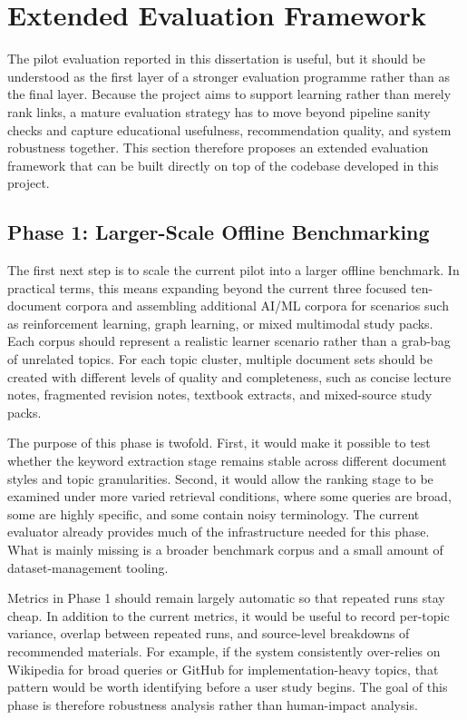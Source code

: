 \documentclass[10pt,journal,compsoc]{IEEEtran}
\begin{document}
\section{Extended Evaluation Framework}

The pilot evaluation reported in this dissertation is useful, but it should be understood as the first layer of a stronger evaluation programme rather than as the final layer. Because the project aims to support learning rather than merely rank links, a mature evaluation strategy has to move beyond pipeline sanity checks and capture educational usefulness, recommendation quality, and system robustness together. This section therefore proposes an extended evaluation framework that can be built directly on top of the codebase developed in this project.

\subsection{Phase 1: Larger-Scale Offline Benchmarking}

The first next step is to scale the current pilot into a larger offline benchmark. In practical terms, this means expanding beyond the current three focused ten-document corpora and assembling additional AI/ML corpora for scenarios such as reinforcement learning, graph learning, or mixed multimodal study packs. Each corpus should represent a realistic learner scenario rather than a grab-bag of unrelated topics. For each topic cluster, multiple document sets should be created with different levels of quality and completeness, such as concise lecture notes, fragmented revision notes, textbook extracts, and mixed-source study packs.

The purpose of this phase is twofold. First, it would make it possible to test whether the keyword extraction stage remains stable across different document styles and topic granularities. Second, it would allow the ranking stage to be examined under more varied retrieval conditions, where some queries are broad, some are highly specific, and some contain noisy terminology. The current evaluator already provides much of the infrastructure needed for this phase. What is mainly missing is a broader benchmark corpus and a small amount of dataset-management tooling.

Metrics in Phase 1 should remain largely automatic so that repeated runs stay cheap. In addition to the current metrics, it would be useful to record per-topic variance, overlap between repeated runs, and source-level breakdowns of recommended materials. For example, if the system consistently over-relies on Wikipedia for broad queries or GitHub for implementation-heavy topics, that pattern would be worth identifying before a user study begins. The goal of this phase is therefore robustness analysis rather than human-impact analysis.
\end{document}

